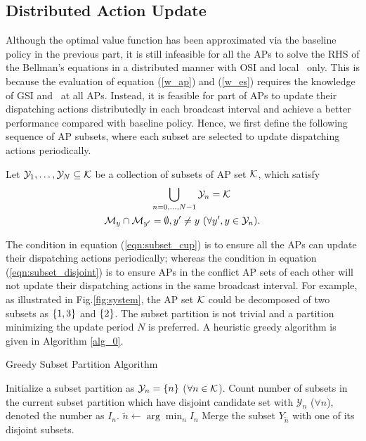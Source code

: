 \subsection{Distributed Action Update}
\label{subsec:ap_alg}
Although the optimal value function has been approximated via the baseline policy in the previous part, it is still infeasible for all the APs to solve the RHS of the Bellman's equations in a distributed manner with OSI and local \brlatency~only.
This is because the evaluation of equation (\ref{w_ap}) and (\ref{w_es}) requires the knowledge of GSI and \brlatency~at all APs.
Instead, it is feasible for part of APs to update their dispatching actions distributedly in each broadcast interval and achieve a better performance compared with baseline policy.
Hence, we first define the following sequence of AP subsets, where each subset are selected to update dispatching actions periodically.
\begin{definition}
    Let $\mathcal{Y}_{1}, \dots, \mathcal{Y}_{N} \subseteq \mathcal{K}$ be a collection of subsets of AP set $\mathcal{K}$, which satisfy
    \begin{align}
        &\bigcup_{n=0,\dots,N-1} \mathcal{Y}_{n} = \mathcal{K}
        \label{eqn:subset_cup}
        \\
        \mathcal{M}_{y} \cap \mathcal{M}_{y'} &=\emptyset, y' \neq y~(\forall y',y \in \mathcal{Y}_{n}).
        \label{eqn:subset_disjoint}
    \end{align}
\end{definition}
The condition in equation (\ref{eqn:subset_cup}) is to ensure all the APs can update their dispatching actions periodically; whereas the condition in equation (\ref{eqn:subset_disjoint}) is to ensure APs in the conflict AP sets of each other will not update their dispatching actions in the same broadcast interval.
For example, as illustrated in Fig.\ref{fig:system}, the AP set $\mathcal{K}$ could be decomposed of two subsets as $\{1,3\}$ and $\{2\}$.
The subset partition is not trivial and {a partition minimizing the update period $N$ is preferred}.
A heuristic greedy algorithm is given in Algorithm \ref{alg_0}.
\begin{algorithm}[ht]
    \caption{Greedy Subset Partition Algorithm}\label{alg_0}
    \DontPrintSemicolon %
    Initialize a subset partition as $\mathcal{Y}_{n} = \{n\}$ ($\forall n\in\mathcal{K}$).\;
    {
        Count number of subsets in the current subset partition which have disjoint candidate set with $\mathcal{Y}_n$ ($\forall n$), denoted the number as $I_{n}$.\;
        $\tilde{n} \gets \arg\min_{n} I_{n}$\;
        Merge the subset $Y_{\tilde{n}}$ with one of its disjoint subsets.\;
    }
\end{algorithm}

